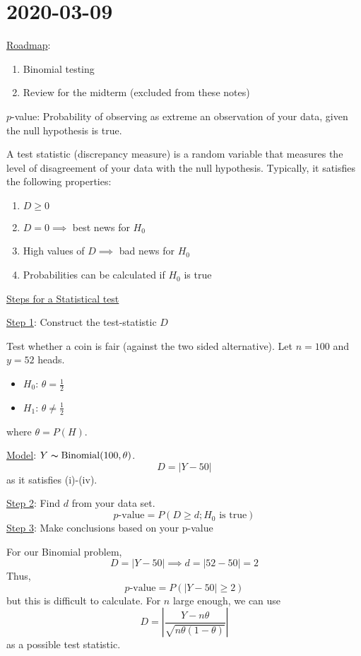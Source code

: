 \section{2020-03-09}
\underline{Roadmap}:
\begin{enumerate}[label=(\roman*)]
    \item Binomial testing
    \item Review for the midterm (excluded from these notes)
\end{enumerate}
\begin{defbox}
    \begin{definition}
        $ p $-value: Probability of observing as extreme an observation of your data,
        given the null hypothesis is true.
    \end{definition}
\end{defbox}

\begin{defbox}
    \begin{definition}
        A test statistic (discrepancy measure) is a random variable that measures
        the level of disagreement of your data with the null hypothesis. Typically,
        it satisfies the following properties:
        \begin{enumerate}[label=(\roman*)]
            \item $ D\geqslant 0 $
            \item $ D=0 \implies $ best news for $ H_0 $
            \item High values of $ D \implies $ bad news for $ H_0 $
            \item Probabilities can be calculated if $ H_0 $ is true
        \end{enumerate}
    \end{definition}
\end{defbox}

\underline{Steps for a Statistical test}

\underline{Step 1}: Construct the test-statistic $ D $
\begin{exbox}
    \begin{example}
        Test whether a coin is fair (against the two sided alternative).
        Let $ n=100 $ and $ y=52 $ heads.
        \begin{itemize}
            \item $ H_0 $: $ \theta=\frac{1}{2} $
            \item $ H_1 $: $ \theta\neq \frac{1}{2} $
        \end{itemize}
        where $ \theta=P(H) $.

        \underline{Model}: $ Y \thicksim \operatorname{Binomial}(100,\theta) $.
        \[ D=|Y-50| \]
        as it satisfies (i)-(iv).
    \end{example}
\end{exbox}
\underline{Step 2}: Find $ d $ from your data set.
\[ p\text{-value}=P(D\geqslant d;H_0\text{ is true}) \]
\underline{Step 3}: Make conclusions based on your p-value

For our Binomial problem,
\[ D=|Y-50|\implies d=|52-50|=2 \]
Thus,
\[ p\text{-value}=P(|Y-50|\geqslant 2) \]
but this is difficult to calculate. For $ n $ large enough, we can use
\[ D=\left| \frac{Y-n\theta}{\sqrt{n\theta(1-\theta)}} \right| \]
as a possible test statistic.
